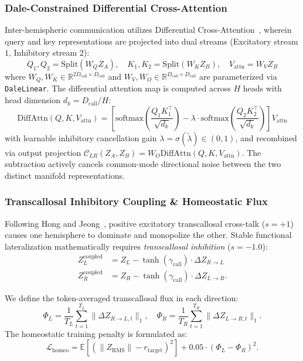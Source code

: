 \documentclass[11pt,a4paper]{article}
\theoremstyle{plain}
\theoremstyle{definition}
\theoremstyle{remark}
\newcommand{\CC}{\mathcal{C}_{LR}}
\newcommand{\softmax}{\mathrm{softmax}}
\newcommand{\DiffAttn}{\mathrm{DiffAttn}}
\begin{document}
\subsubsection{Dale-Constrained Differential Cross-Attention}

Inter-hemispheric communication utilizes Differential Cross-Attention~\cite{ye2025differential}, wherein query and key representations are projected into dual streams (Excitatory stream $1$, Inhibitory stream $2$):
\begin{equation}
    Q_1, Q_2 = \mathrm{Split}(W_Q Z_A), \quad K_1, K_2 = \mathrm{Split}(W_K Z_B), \quad V_{\mathrm{attn}} = W_V Z_B
\end{equation}
where $W_Q, W_K \in \mathbb{R}^{2 D_{\mathrm{call}} \times D_{\mathrm{call}}}$ and $W_V, W_O \in \mathbb{R}^{D_{\mathrm{call}} \times D_{\mathrm{call}}}$ are parameterized via \texttt{DaleLinear}. The differential attention map is computed across $H$ heads with head dimension $d_k = D_{\mathrm{call}} / H$:
\begin{equation}
    \DiffAttn(Q, K, V_{\mathrm{attn}}) = \left[ \softmax\left(\frac{Q_1 K_1^\top}{\sqrt{d_k}}\right) - \lambda \cdot \softmax\left(\frac{Q_2 K_2^\top}{\sqrt{d_k}}\right) \right] V_{\mathrm{attn}}
\end{equation}
with learnable inhibitory cancellation gain $\lambda = \sigma(\tilde{\lambda}) \in (0, 1)$, and recombined via output projection $\CC(Z_A, Z_B) = W_O \DiffAttn(Q, K, V_{\mathrm{attn}})$. The subtraction actively cancels common-mode directional noise between the two distinct manifold representations.

\subsubsection{Transcallosal Inhibitory Coupling \& Homeostatic Flux}

Following Hong and Jeong~\cite{jeong2026lateralization}, positive excitatory transcallosal cross-talk ($s = +1$) causes one hemisphere to dominate and monopolize the other. Stable functional lateralization mathematically requires \emph{transcallosal inhibition} ($s = -1.0$):
\begin{align}
    Z_L^{\mathrm{coupled}} &= Z_L - \tanh(\gamma_{\mathrm{call}}) \cdot \Delta Z_{R \to L} \\
    Z_R^{\mathrm{coupled}} &= Z_R - \tanh(\gamma_{\mathrm{call}}) \cdot \Delta Z_{L \to R}.
\end{align}

We define the token-averaged transcallosal flux in each direction:
\begin{equation}
    \Phi_L = \frac{1}{T_L} \sum_{t=1}^{T_L} \|\Delta Z_{R \to L, t}\|_1, \quad \Phi_R = \frac{1}{T_R} \sum_{t=1}^{T_R} \|\Delta Z_{L \to R, t}\|_1.
\end{equation}
The homeostatic training penalty is formulated as:
\begin{equation}
    \mathcal{L}_{\mathrm{homeo}} = \mathbb{E}\left[(\|Z_{\mathrm{RMS}}\| - r_{\mathrm{target}})^2\right] + 0.05 \cdot (\Phi_L - \Phi_R)^2.
\end{equation}
\end{document}

